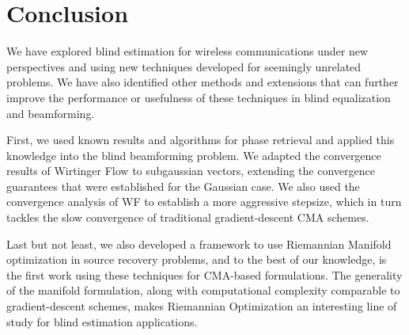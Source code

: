 \chapter{Conclusion}
\label{chap:conclusion}

We have explored blind estimation for wireless communications under new perspectives and using new techniques developed for seemingly unrelated problems. We have also identified other methods and extensions that can further improve the performance or usefulness of these techniques in blind equalization and beamforming.

First, we used known results and algorithms for phase retrieval and applied this knowledge into the blind beamforming problem. We adapted the convergence results of Wirtinger Flow to subgaussian vectors, extending the convergence guarantees that were established for the Gaussian case. We also used the convergence analysis of WF to establish a more aggressive stepsize, which in turn tackles the slow convergence of traditional gradient-descent CMA schemes. 

Last but not least, we also developed a framework to use Riemannian Manifold optimization in source recovery problems, and to the best of our knowledge, is the first work using these techniques for CMA-based formulations. The generality of the manifold formulation, along with computational complexity comparable to gradient-descent schemes, makes Riemannian Optimization an interesting line of study for blind estimation applications.  





